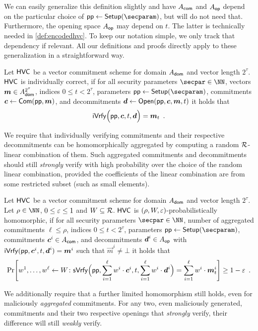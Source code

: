 We can easily generalize this definition slightly and have $A_{\mathsf{com}}$ and $A_{\mathsf{op}}$ depend on the particular choice of $\params\gets\setup(\secparam)$, but will do not need that.
Furthermore, the opening space $A_{\mathsf{op}}$ may depend on $t$. The latter is technically needed in \autoref{def:encodedhvc}.
To keep our notation simple, we only track that dependency if relevant.
All our definitions and proofs directly apply to these generalization in a straightforward way.
\begin{definition}\label{def:individual_correctness}
Let $\mathsf{HVC}$ be a vector commitment scheme for domain $A_{\mathsf{dom}}$ and vector length $2^\tau$.
  $\mathsf{HVC}$ is individually correct, if for all security parameters $\secpar\in\NN$, vectors $\boldsymbol{m}\in A_{\mathsf{dom}}^{2^\tau}$, indices $0\leq t < 2^\tau$, parameters $\params \gets \setup(\secparam)$, commitments $\boldsymbol{c} \gets \mathsf{Com}(\mathsf{pp},\boldsymbol{m})$, and decommitments $\boldsymbol{d} \gets \mathsf{Open}(\mathsf{pp},\boldsymbol{c},\boldsymbol{m},t)$ it holds that
  \[
    \mathsf{iVrfy}\Bigl(\mathsf{pp},\boldsymbol{c},t,\boldsymbol{d}\Bigr) = \boldsymbol{m}_{t}\enspace.
  \]
\end{definition}
%
We require that individually verifying commitments and their respective decommitments can be homomorphically aggregated by computing a random $\mathcal{R}$-linear combination of them.
Such aggregated commitments and decommitments should still \emph{strongly} verify with high probability over the choice of the random linear combination, provided the coefficients of the linear combination are from some restricted subset (such as small elements).

\begin{definition}\label{def:probabilist_homomorphism}
Let $\mathsf{HVC}$ be a vector commitment scheme for domain $A_{\mathsf{dom}}$ and vector length $2^\tau$. %
Let $\rho\in\NN$, $0\leq \varepsilon \leq 1$ and $W\subseteq\mathcal{R}$.
$\mathsf{HVC}$ is $(\rho,W,\varepsilon)$-probabilistically homomorphic, if for all security parameters $\secpar\in\NN$, number of aggregated commitments $\ell \leq \rho$, indices $0\leq t < 2^\tau$, parameters $\params \gets \setup(\secparam)$, commitments $\boldsymbol{c}^i\in A_{\mathsf{com}}$, and decommitments $\boldsymbol{d}^i\in A_{\mathsf{op}}$ with $\mathsf{iVrfy}(\mathsf{pp},\boldsymbol{c}^i,t,\boldsymbol{d}^i) = \boldsymbol{m}^i$ such that $\vec{m}^i \neq \bot$ it holds that
  \[
    \Pr\mleft[
      w^1,\dots,w^{\ell} \gets W \colon
      \sverify\Bigl(\params,\sum_{i=1}^{\ell}w^i\cdot \vec{c}^i,t,\sum_{i=1}^{\ell}w^i\cdot \vec{d}^i\Bigr) = \sum_{i=1}^{\ell}w^i\cdot\vec{m}^i_{t}
    \mright] \geq 1-\errorbound\enspace.
  \]
\end{definition}
%
We additionally require that a further limited homomorphism still holds, even for maliciously \emph{aggregated} commitments.
For any two, even maliciously generated, commitments and their two respective openings that \emph{strongly} verify, their difference will still \emph{weakly} verify.

